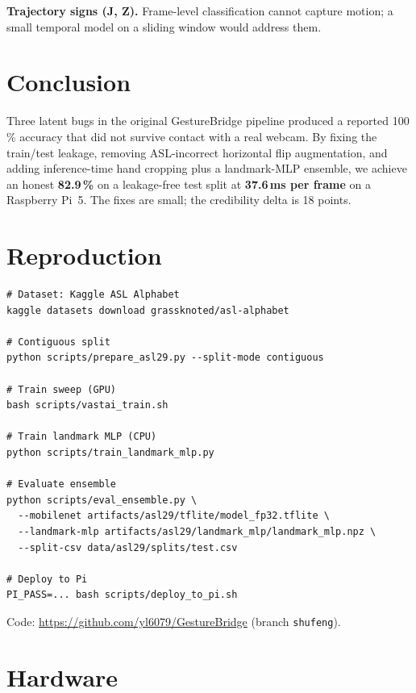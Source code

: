 \documentclass[sigconf,nonacm]{acmart}
\begin{document}
\textbf{Trajectory signs (J, Z).}  Frame-level classification cannot
capture motion; a small temporal model on a sliding window would address
them.

\section{Conclusion}

Three latent bugs in the original GestureBridge pipeline produced a
reported 100\,\% accuracy that did not survive contact with a real
webcam.  By fixing the train/test leakage, removing ASL-incorrect
horizontal flip augmentation, and adding inference-time hand cropping
plus a landmark-MLP ensemble, we achieve an honest \textbf{82.9\,\%} on
a leakage-free test split at \textbf{37.6\,ms per frame} on a Raspberry
Pi~5.  The fixes are small; the credibility delta is 18 points.

\appendix

\section{Reproduction}
\label{app:repro}

\begin{lstlisting}
# Dataset: Kaggle ASL Alphabet
kaggle datasets download grassknoted/asl-alphabet

# Contiguous split
python scripts/prepare_asl29.py --split-mode contiguous

# Train sweep (GPU)
bash scripts/vastai_train.sh

# Train landmark MLP (CPU)
python scripts/train_landmark_mlp.py

# Evaluate ensemble
python scripts/eval_ensemble.py \
  --mobilenet artifacts/asl29/tflite/model_fp32.tflite \
  --landmark-mlp artifacts/asl29/landmark_mlp/landmark_mlp.npz \
  --split-csv data/asl29/splits/test.csv

# Deploy to Pi
PI_PASS=... bash scripts/deploy_to_pi.sh
\end{lstlisting}

Code: \url{https://github.com/yl6079/GestureBridge} (branch \texttt{shufeng}).

\section{Hardware}
\label{app:hw}
\end{document}
